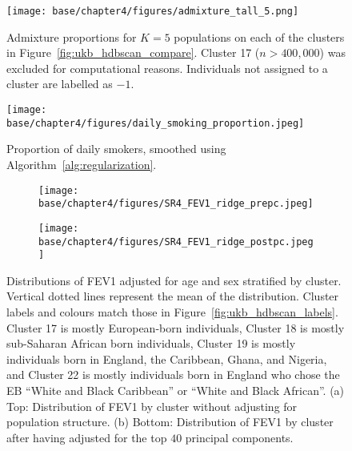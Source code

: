 \begin{figure}[ht]
  \centering
    \texttt{[image: base/chapter4/figures/admixture\_tall\_5.png]}
    \caption[Admixture proportions for 5 populations]{Admixture proportions for $K=5$ populations on each of the clusters in Figure~\ref{fig:ukb_hdbscan_compare}. Cluster 17 ($n>400,000$) was excluded for computational reasons. Individuals not assigned to a cluster are labelled as $-1$.}
  \label{fig:supp_ukb_admix}
\end{figure}

\clearpage

\begin{figure}[ht]
  \centering
    \texttt{[image: base/chapter4/figures/daily\_smoking\_proportion.jpeg]}
    \caption[Proportion of daily smokers]{Proportion of daily smokers, smoothed using Algorithm~\ref{alg:regularization}.}
    \label{fig:supp_ukb_smoking}
\end{figure}

\clearpage

\begin{figure}[ht]
  \centering
  \begin{subfigure}[b]{0.7\linewidth}
    \texttt{[image: base/chapter4/figures/SR4\_FEV1\_ridge\_prepc.jpeg]}
    \caption{}
    \label{fig:supp_pheno_ridge_fev_pre}
  \end{subfigure}
    \begin{subfigure}[b]{0.7\linewidth}
    \texttt{[image: base/chapter4/figures/SR4\_FEV1\_ridge\_postpc.jpeg]}
    \caption{}
    \label{fig:supp_pheno_ridge_fev_post}
  \end{subfigure}
  \caption[Distributions of FEV1 by cluster]{Distributions of FEV1 adjusted for age and sex stratified by cluster. Vertical dotted lines represent the mean of the distribution. Cluster labels and colours match those in Figure~\ref{fig:ukb_hdbscan_labels}. Cluster 17 is mostly European-born individuals, Cluster 18 is mostly sub-Saharan African born individuals, Cluster 19 is mostly individuals born in England, the Caribbean, Ghana, and Nigeria, and Cluster 22 is mostly individuals born in England who chose the EB ``White and Black Caribbean'' or ``White and Black African''. (a) Top: Distribution of FEV1 by cluster without adjusting for population structure. (b) Bottom: Distribution of FEV1 by cluster after having adjusted for the top $40$ principal components.}
  \label{fig:supp_pheno_ridge_fev}
\end{figure}

